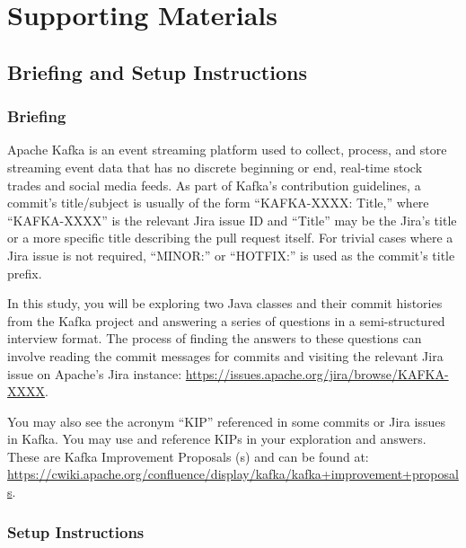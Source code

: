 \chapter{Supporting Materials}

\section{Briefing and Setup Instructions}
\label{sec:Briefing-and-Setup}

\subsection{Briefing}
\label{subsec:Briefing}

Apache Kafka is an event streaming platform used to collect, process, and store streaming event data that has no discrete beginning or end, \eg real-time stock trades and social media feeds. 
As part of Kafka’s contribution guidelines, a commit’s title/subject is usually of the form ``KAFKA-XXXX: Title,'' where ``KAFKA-XXXX'' is the relevant Jira issue ID and ``Title'' may be the Jira’s title or a more specific title describing the pull request itself. 
For trivial cases where a Jira issue is not required, ``MINOR:'' or ``HOTFIX:'' is used as the commit’s title prefix.

In this study, you will be exploring two Java classes and their commit histories from the Kafka project and answering a series of questions in a semi-structured interview format. The process of finding the answers to these questions can involve reading the commit messages for commits and visiting the relevant Jira issue on Apache’s Jira instance:
\url{https://issues.apache.org/jira/browse/KAFKA-XXXX}.

You may also see the acronym ``KIP'' referenced in some commits or Jira issues in Kafka. You may use and reference KIPs in your exploration and answers. These are Kafka Improvement Proposals (s) and can be found at: 
\url{https://cwiki.apache.org/confluence/display/kafka/kafka+improvement+proposals}.

\subsection{Setup Instructions}
\label{sec:Setup-Instructions}

